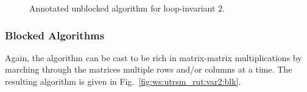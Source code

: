 \renewcommand{\moveboundaries}{
$
\FlaOneByTwo{ B_L }
            { B_R } 
\leftarrow
\FlaOneByThreeR{ B_0 } { b_1 } { B_2 },
\FlaOneByTwo{ \hat{B}_L }
            { \hat{B}_R } 
\leftarrow
\FlaOneByThreeR{ \hat{B}_0 } { \hat{b}_1 } { \hat{B}_2 }
$ \\
and
$ 
\FlaTwoByTwo{ U_{TL} }{ U_{TR} }
            {    0   }{ U_{BR} } \leftarrow
\FlaThreeByThreeBR{ U_{00} } { u_{01}        } { U_{02}     }
                  {   0    } { \upsilon_{11} } { u_{12}^{T} }
                  {   0    } {      0        } { U_{22}     }  
$
}

\renewcommand{\beforeupdate}{
\FlaOneByTwo{ \FlaOneByTwoSingleLine{ B_{0} }
                                    { b_{1} } }
	                            { B_{2} } 
=
\FlaOneByTwo{ \FlaOneByTwoSingleLine{ \hat{B}_0 - B_{2}U_{02}^T }
                                    { \hat{b}_1 - B_2 u_{12}   } }
	    { \hat{B}_{2}U_{22}^{-T} }
}

\renewcommand{\afterupdate}{
\FlaOneByTwo{ B_{0} }{\FlaOneByTwoSingleLine{ b_{1} } { B_{2} }  }
=
\FlaOneByTwo { ( \hat{B}_0 - B_{2} U_{02}^{T} ) - b_{1} u_{01}^{T} }
             {
               \FlaOneByTwoSingleLine { ( \hat{b}_1 - B_2 u_{12} ) \upsilon_{11}^{-1} }
                                      { \hat{B}_{2} U_{22}^{-T} } } 
\wedge \ldots
}

\renewcommand{\update}{
\begin{minipage}[t]{4in}
\noindent
$ B_0   \becomes B_0 -  b_{1} u_{01}^T $ \\
$ b_{1} \becomes \hat{b}_{1} \upsilon_{11}^{-1} $ \\
\end{minipage}
}

\begin{figure}[htbp]
\worksheet
\caption{Annotated unblocked algorithm for loop-invariant 2.}
\label{fig:ws:utrsm_rut:var2}
\end{figure}

\subsubsection{Blocked Algorithms}

Again, the algorithm can be cast to be rich in
matrix-matrix multiplications by marching through
the matrices multiple rows and/or columns at a time.
The resulting algorithm is given in 
Fig.~\ref{fig:ws:utrsm_rut:var2:blk}.

